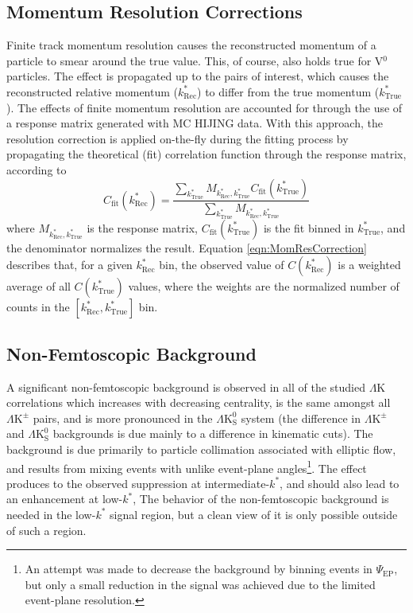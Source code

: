 \documentclass[ALICE,manyauthors]{cernphprep}
\newcommand{\kstar}{$k^{*}$\xspace}
\newcommand{\ktrue}{$k^{*}_{\mathrm{True}}$\xspace}
\newcommand{\krec}{$k^{*}_{\mathrm{Rec}}$\xspace}
\newcommand{\LamK}{$\Lambda$K\xspace}
\newcommand{\LamKpm}{$\Lambda\mathrm{K^{\pm}}$\xspace}
\newcommand{\LamKs}{$\Lambda\mathrm{K^{0}_{S}}$\xspace}
\newcommand{\Vz}{V$^{0}$\xspace}
\begin{document}
\subsection{Momentum Resolution Corrections}
\label{MomentumResolutionCorrections}

Finite track momentum resolution causes the reconstructed momentum of a particle to smear around the true value.
This, of course, also holds true for \Vz particles.
The effect is propagated up to the pairs of interest, which causes the reconstructed relative momentum (\krec) to differ from the true momentum (\ktrue).
The effects of finite momentum resolution are accounted for through the use of a response matrix generated with MC HIJING data.
With this approach, the resolution correction is applied on-the-fly during the fitting process by propagating the theoretical (fit) correlation function through the response matrix, according to
\begin{equation}
  C_{\mathrm{fit}}(k^{*}_{\mathrm{Rec}}) = \dfrac{\sum\limits_{k^{*}_{\mathrm{True}}}M_{k^{*}_{\mathrm{Rec}},k^{*}_{\mathrm{True}}}C_{\mathrm{fit}}(k^{*}_{\mathrm{True}})}{\sum\limits_{k^{*}_{\mathrm{True}}}M_{k^{*}_{\mathrm{Rec}},k^{*}_{\mathrm{True}}}}
\label{eqn:MomResCorrection}
\end{equation}
where $M_{k^{*}_{\mathrm{Rec}},k^{*}_{\mathrm{True}}}$ is the response matrix, $C_{\mathrm{fit}}(k^{*}_{\mathrm{True}})$ is the fit binned in \ktrue, and the denominator normalizes the result.
Equation \ref{eqn:MomResCorrection} describes that, for a given \krec bin, the observed value of $C(k^{*}_{\mathrm{Rec}})$ is a weighted average of all $C(k^{*}_{\mathrm{True}})$ values, where the weights are the normalized number of counts in the \mbox{$[k^{*}_{\mathrm{Rec}}, k^{*}_{\mathrm{True}}]$} bin.



\subsection{Non-Femtoscopic Background}
\label{NonFlatBackground}

A significant non-femtoscopic background is observed in all of the studied \LamK correlations which increases with decreasing centrality, is the same amongst all \LamKpm pairs, and is more pronounced in the \LamKs system (the difference in \LamKpm and \LamKs backgrounds is due mainly to a difference in kinematic cuts).  
The background is due primarily to particle collimation associated with elliptic flow, and results from mixing events with unlike event-plane angles\footnote[1]
{
An attempt was made to decrease the background by binning events in $\Psi_{\mathrm{EP}}$, but only a small reduction in the signal was achieved due to the limited event-plane resolution.
}\cite{Kisiel:2017}.
The effect produces to the observed suppression at intermediate-\kstar, and should also lead to an enhancement at low-\kstar,
The behavior of the non-femtoscopic background is needed in the low-\kstar signal region, but a clean view of it is only possible outside of such a region.
\end{document}
